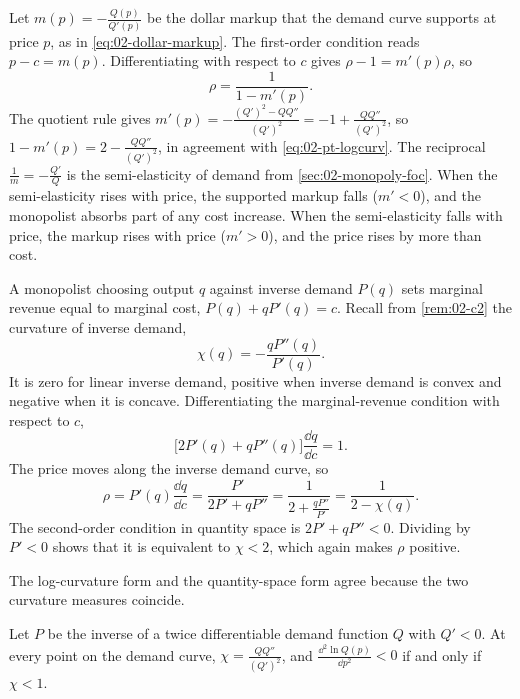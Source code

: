 Let $m(p) = -\frac{Q(p)}{Q'(p)}$ be the dollar markup that the demand curve supports at price $p$, as in
\eqref{eq:02-dollar-markup}. The first-order condition reads $p - c = m(p)$. Differentiating with respect to $c$
gives $\rho - 1 = m'(p)\rho$, so
\begin{equation}\label{eq:02-pt-markup}
\rho = \frac{1}{1 - m'(p)} .
\end{equation}
The quotient rule gives $m'(p) = -\frac{(Q')^2 - QQ''}{(Q')^2} = -1 + \frac{QQ''}{(Q')^2}$, so
$1 - m'(p) = 2 - \frac{QQ''}{(Q')^2}$, in agreement with \eqref{eq:02-pt-logcurv}. The reciprocal $\frac{1}{m}
= -\frac{Q'}{Q}$ is the semi-elasticity of demand from \cref{sec:02-monopoly-foc}.
When the semi-elasticity rises with price, the supported markup falls ($m' < 0$), and the monopolist absorbs part
of any cost increase. When the semi-elasticity falls with price, the markup rises with price ($m' > 0$), and the
price rises by more than cost.

A monopolist choosing output $q$ against inverse demand $P(q)$ sets marginal revenue equal to marginal cost,
$P(q) + qP'(q) = c$. Recall from \cref{rem:02-c2} the curvature of inverse demand,
\begin{equation}\label{eq:02-chi}
\chi(q) = -\frac{qP''(q)}{P'(q)} .
\end{equation}
It is zero for linear inverse demand, positive when inverse demand is convex and negative when it is concave.
Differentiating the marginal-revenue condition with respect to $c$,
\begin{equation*}
\bigl[2P'(q) + qP''(q)\bigr]\frac{\dd q}{\dd c} = 1 .
\end{equation*}
The price moves along the inverse demand curve, so
\begin{equation}\label{eq:02-pt-quantity}
\rho = P'(q)\frac{\dd q}{\dd c} = \frac{P'}{2P' + qP''} = \frac{1}{2 + \frac{qP''}{P'}} = \frac{1}{2 - \chi(q)} .
\end{equation}
The second-order condition in quantity space is $2P' + qP'' < 0$. Dividing by $P' < 0$ shows that it is
equivalent to $\chi < 2$, which again makes $\rho$ positive.

The log-curvature form and the quantity-space form agree because the two curvature measures coincide.

\begin{lemma}\label{lem:02-chi-direct}
Let $P$ be the inverse of a twice differentiable demand function $Q$ with $Q' < 0$. At every point on the demand
curve, $\chi = \frac{QQ''}{(Q')^2}$, and $\frac{\dd^2 \ln Q(p)}{\dd p^2} < 0$ if and only if $\chi < 1$.
\end{lemma}

